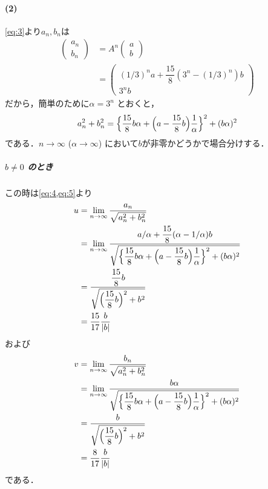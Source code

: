 \documentclass[../../main.tex]{subfiles}
\begin{document}
\paragraph{(2)}

\cref{eq:3}より$a_n,b_n$は
\begin{align}
  \begin{pmatrix} a_n \\ b_n
  \end{pmatrix} &= A^n
  \begin{pmatrix} a \\ b
  \end{pmatrix} \\
  &=
  \begin{pmatrix} (1/3)^n a + \dfrac{15}{8}(3^n - (1/3)^n) b \\ 3^n b
  \end{pmatrix} \label{eq:4}
\end{align}
だから，簡単のために$\alpha = 3^n$ とおくと，
\begin{align}
  a_n^2 + b_n^2 = \Bigl\{ \dfrac{15}{8} b \alpha + \Bigl(a - \dfrac{15}{8}b\Bigr) \dfrac{1}{\alpha} \Bigr\}^2 + (b\alpha)^2 \label{eq:5}
\end{align}
である．$n \to \infty$ ($\alpha \to \infty$) において$b$が非零かどうかで場合分けする．

\subparagraph{$b \ne 0$ のとき}

この時は\cref{eq:4,eq:5}より
\begin{align}
  u
  &= \lim_{n \to \infty} \dfrac{a_n}{\sqrt{a_n^2 + b_n^2}} \\
  &= \lim_{n \to \infty} \dfrac{a/\alpha + \dfrac{15}{8}(\alpha - 1/\alpha) b}{\sqrt{\Bigl\{ \dfrac{15}{8} b \alpha + \Bigl(a - \dfrac{15}{8}b\Bigr) \dfrac{1}{\alpha} \Bigr\}^2 + (b\alpha)^2}}\\
  &= \dfrac{\dfrac{15}{8}b}{\sqrt{\Bigl(\dfrac{15}{8}b\Bigr)^2 + b^2}} \\
  &= \dfrac{15}{17}\dfrac{b}{|b|}
\end{align}
および
\begin{align}
  v
  &= \lim_{n \to \infty} \dfrac{b_n}{\sqrt{a_n^2 + b_n^2}} \\
  &= \lim_{n \to \infty} \dfrac{b\alpha}{\sqrt{\Bigl\{ \dfrac{15}{8} b \alpha + \Bigl(a - \dfrac{15}{8}b\Bigr) \dfrac{1}{\alpha} \Bigr\}^2 + (b\alpha)^2}} \\
  &= \dfrac{b}{\sqrt{\Bigl(\dfrac{15}{8}b\Bigr)^2 + b^2}} \\
  &= \dfrac{8}{17}\dfrac{b}{|b|}
\end{align}
である．
\end{document}
